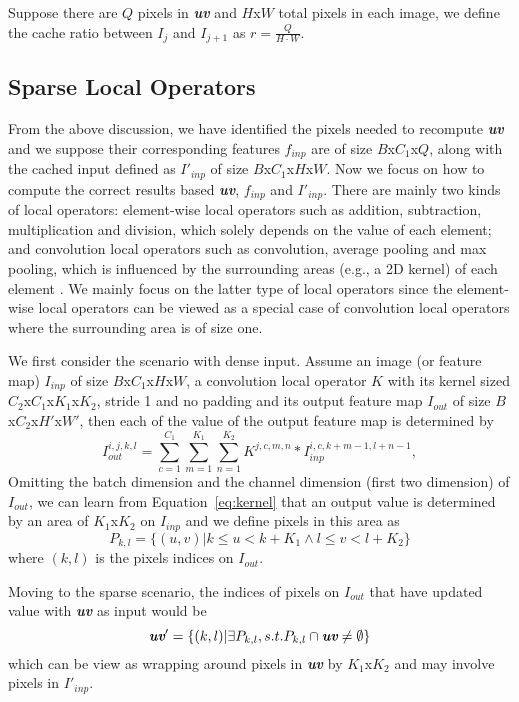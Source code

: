 Suppose there are $Q$ pixels in \textit{\textbf{uv}} and $H$x$W$ total pixels in each image,
we define the cache ratio between $I_j$ and $I_{j+1}$ as $r = \frac{Q}{H\cdot W}$.

\subsection{Sparse Local Operators\label{sec:sparse}}
From the above discussion, we have identified the pixels needed to recompute \textit{\textbf{uv}} and we suppose their corresponding features $f_{inp}$ are of size $B$x$C_1$x$Q$, along with the cached input defined as $I'_{inp}$ of size $B$x$C_1$x$H$x$W$.
Now we focus on how to compute the correct results based \textit{\textbf{uv}}, $f_{inp}$ and $I'_{inp}$.
There are mainly two kinds of local operators: element-wise local operators such as addition, subtraction, multiplication and division, which solely depends on the value of each element; and convolution local operators such as convolution, average pooling and max pooling, which is influenced by the surrounding areas (e.g., a 2D kernel) of each element .
We mainly focus on the latter type of local operators since the element-wise local operators can be viewed as a special case of convolution local operators where the surrounding area is of size one.

We first consider the scenario with dense input.
Assume an image (or feature map) $I_{inp}$ of size $B$x$C_1$x$H$x$W$, a convolution local operator $K$ with its kernel sized $C_2$x$C_1$x$K_1$x$K_2$, stride 1 and no padding and its output feature map $I_{out}$ of size $B$x$C_2$x$H'$x$W'$, then each of the value of the output feature map is determined by
\begin{equation}
    I_{out}^{i,j,k,l} = \sum_{c=1}^{C_1} \sum_{m=1}^{K_1} \sum_{n=1}^{K_2} K^{j,c,m,n} * I_{inp}^{i,c,k+m-1,l+n-1}, 
    \label{eq:kernel}
\end{equation}
Omitting the batch dimension and the channel dimension (first two dimension) of $I_{out}$, we can learn from Equation~\ref{eq:kernel} that an output value is determined by an area of $K_1$x$K_2$ on $I_{inp}$ and we define pixels in this area as
\begin{equation}
    P_{k,l} = \{(u,v)|k\leq u < k+K_1 \land l\leq v < l+K_2\}
    \label{eq:set}
\end{equation}
where $(k,l)$ is the pixels indices on $I_{out}$.

Moving to the sparse scenario, 
the indices of pixels on $I_{out}$ that have updated value with \textit{\textbf{uv}} as input would be 
\begin{equation}
\textit{\textbf{uv}}' = \{(k,l)|\exists P_{k,l}, s.t. P_{k,l}\cap \textit{\textbf{uv}} \neq \emptyset\}
\end{equation} 
which can be view as wrapping around pixels in \textit{\textbf{uv}} by $K_1$x$K_2$ and may involve pixels in $I'_{inp}$.


